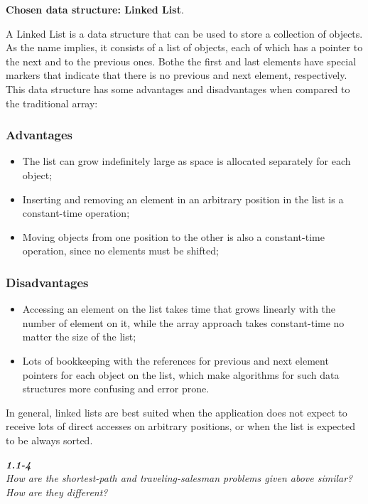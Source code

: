 \documentclass[8pt,a4paper]{article}
\begin{document}
\textbf{Chosen data structure: Linked List}.

A Linked List is a data structure that can be used to store a collection of objects.
As the name implies, it consists of a list of objects, each of which has a pointer
to the next and to the previous ones. Bothe the first and last elements have
special markers that indicate that there is no previous and next element, respectively.
This data structure has some advantages and disadvantages when compared to the
traditional array:

\subsubsection*{Advantages}
\begin{itemize}
  \item The list can grow indefinitely large as space is allocated separately
    for each object;
  \item Inserting and removing an element in an arbitrary position in the
    list is a constant-time operation;
  \item Moving objects from one position to the other is also a  constant-time
    operation, since no elements must be shifted;
\end{itemize}

\subsubsection*{Disadvantages}
\begin{itemize}
  \item Accessing an element on the list takes time that grows linearly with
    the number of element on it, while the array approach takes constant-time
    no matter the size of the list;
  \item Lots of bookkeeping with the references for previous and next element
    pointers for each object on the list, which make algorithms for such data
    structures more confusing and error prone.
\end{itemize}

In general, linked lists are best suited when the application does not expect
to receive lots of direct accesses on arbitrary positions, or when the list
is expected to be always sorted.

\begin{framed}
\textbf{\textit{1.1-4}} \\
\textit{How are the shortest-path and traveling-salesman problems given above
similar? How are they different?}
\end{framed}
\end{document}
